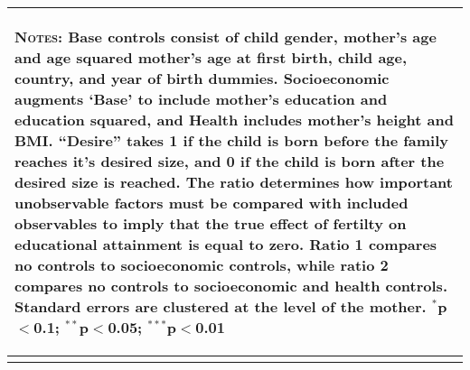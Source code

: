 \begin{landscape}
\begin{table}[!htbp]
\begin{tabular}{lccccccc}
\multicolumn{8}{p{17.8cm}}{\begin{footnotesize}\textsc{Notes:} Base controls consist of child gender, mother's age and age squared mother's age at first birth, child age, country, and year of birth dummies.  Socioeconomic augments `Base' to include mother's education and education squared, and Health includes mother's height and BMI. ``Desire'' takes 1 if the child is born before the family reaches it's desired size, and 0 if the child is born after the desired size is reached. The \citet{Altonjietal2005} ratio determines how important unobservable factors must be compared with included observables to imply that the true effect of fertilty on educational attainment is equal to zero.  Ratio 1 compares no controls to socioeconomic controls, while ratio 2 compares no controls to socioeconomic and health controls. Standard errors are clustered at the level of the mother.
$^{*}$p$<$0.1; $^{**}$p$<$0.05; $^{***}$p$<$0.01\end{footnotesize}}\\  
\bottomrule \normalsize\end{tabular}\end{table}\end{landscape} 
